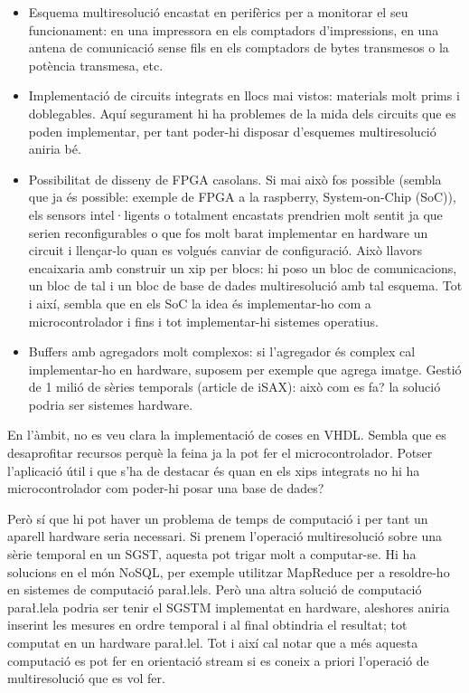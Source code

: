 \begin{itemize}
\begin{itemize}
  \item Esquema multiresolució encastat en perifèrics per a monitorar
    el seu funcionament: en una impressora en els comptadors
    d'impressions, en una antena de comunicació sense fils en els
    comptadors de bytes transmesos o la potència transmesa, etc.

  \item Implementació de circuits integrats en llocs mai vistos:
    materials molt prims i doblegables. Aquí segurament hi ha
    problemes de la mida dels circuits que es poden implementar, per
    tant poder-hi disposar d'esquemes multiresolució aniria bé.

  \item Possibilitat de disseny de FPGA casolans. Si mai això fos
    possible (sembla que ja és possible: exemple de FPGA a la
    raspberry, System-on-Chip (SoC)), els sensors intel·ligents o
    totalment encastats prendrien molt sentit ja que serien
    reconfigurables o que fos molt barat implementar en hardware un
    circuit i llençar-lo quan es volgués canviar de configuració. Això
    llavors encaixaria amb construir un xip per blocs: hi poso un bloc
    de comunicacions, un bloc de tal i un bloc de base de dades
    multiresolució amb tal esquema. Tot i així, sembla que en els SoC
    la idea és implementar-ho com a microcontrolador i fins i tot
    implementar-hi sistemes operatius.

  \item Buffers amb agregadors molt complexos: si l'agregador és complex cal implementar-ho en hardware, suposem per exemple que agrega imatge. Gestió de 1 milió de sèries temporals (article de iSAX): això com es fa? la solució podria ser sistemes hardware.


  \end{itemize}


\end{itemize}

En l'àmbit, no es veu clara la implementació de coses en VHDL. Sembla que es desaprofitar recursos perquè la feina ja la pot fer el microcontrolador. Potser l'aplicació útil i que s'ha de destacar és quan en els xips integrats no hi ha microcontrolador com poder-hi posar una base de dades?

Però sí que hi pot haver un problema de temps de computació i per tant
un aparell hardware seria necessari. Si prenem l'operació multiresolució sobre una sèrie temporal en un SGST, aquesta pot trigar molt a computar-se. Hi ha solucions en el món NoSQL, per exemple utilitzar MapReduce per a resoldre-ho en sistemes de computació para\l.lels. Però una altra solució de computació para\l.lela podria ser tenir el SGSTM implementat en hardware, aleshores aniria inserint les mesures en ordre temporal i al final obtindria el resultat; tot computat en un hardware para\l.lel. Tot i així cal notar que a més aquesta computació es pot fer en orientació stream si es coneix a priori l'operació de multiresolució que es vol fer.



